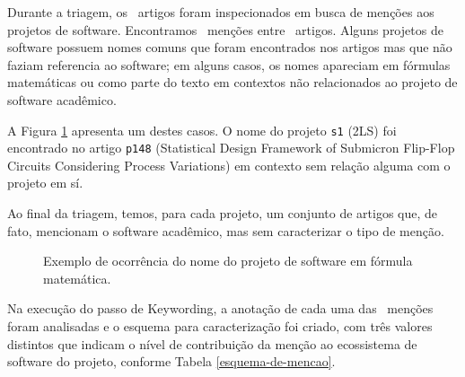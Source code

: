 Durante a triagem, 
os \SearchUniqueCount \ artigos foram inspecionados em busca de menções aos
projetos de software. Encontramos \ScreeningCount \ menções entre
\ScreeningUniqueCount \ artigos.
Alguns projetos de software possuem nomes comuns que foram encontrados nos
artigos mas que não faziam referencia ao software; em alguns casos, os nomes
apareciam em fórmulas matemáticas ou como parte do texto em contextos não
relacionados ao projeto de software acadêmico.

A Figura \ref{screenshot-paper-p148-2ls} apresenta um destes casos. O nome do
projeto \texttt{s1} (2LS) foi encontrado no artigo \texttt{p148} (Statistical
Design Framework of Submicron Flip-Flop Circuits Considering Process
Variations) em contexto sem relação alguma com o projeto em sí.

Ao final da triagem, temos, para cada projeto, um conjunto de artigos que, de
fato, mencionam o software acadêmico, mas sem caracterizar o tipo de menção.

\begin{figure}[h]
  \center
  \caption{Exemplo de ocorrência do nome do projeto de software em fórmula matemática.}
  \label{screenshot-paper-p148-2ls}
\end{figure}



Na execução do passo de Keywording, 
a anotação de cada uma das \ScreeningCount \ menções foram analisadas e o
esquema para caracterização foi criado, com três valores distintos que
indicam o nível de contribuição da menção ao ecossistema de software do projeto,
conforme Tabela \ref{esquema-de-mencao}.

